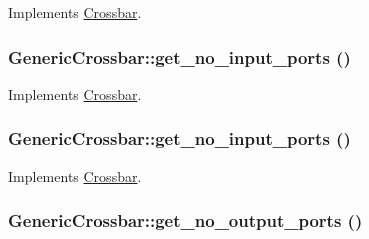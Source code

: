 Implements \hyperlink{classCrossbar_a8e1c2a18960f4e6b9c076246239b092}{Crossbar}.\hypertarget{classGenericCrossbar_8758e38060de9899fa70ad069b83e9fc}{
\subsubsection[{get\_\-no\_\-input\_\-ports}]{ GenericCrossbar::get\_\-no\_\-input\_\-ports ()}}
\label{classGenericCrossbar_8758e38060de9899fa70ad069b83e9fc}




Implements \hyperlink{classCrossbar_ec960231980043c3669add726b239e50}{Crossbar}.\hypertarget{classGenericCrossbar_8758e38060de9899fa70ad069b83e9fc}{
\subsubsection[{get\_\-no\_\-input\_\-ports}]{ GenericCrossbar::get\_\-no\_\-input\_\-ports ()}}
\label{classGenericCrossbar_8758e38060de9899fa70ad069b83e9fc}




Implements \hyperlink{classCrossbar_ec960231980043c3669add726b239e50}{Crossbar}.\hypertarget{classGenericCrossbar_6ca09eb5520228b39d718e3994a5b84f}{
\subsubsection[{get\_\-no\_\-output\_\-ports}]{ GenericCrossbar::get\_\-no\_\-output\_\-ports ()}}
\label{classGenericCrossbar_6ca09eb5520228b39d718e3994a5b84f}




